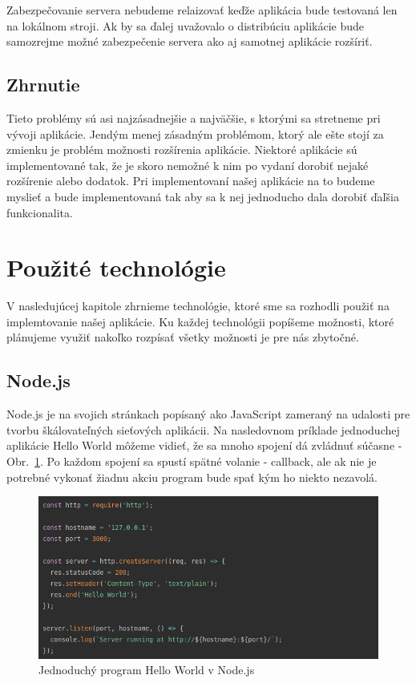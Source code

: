\indent Zabezpečovanie servera nebudeme relaizovať keďže aplikácia bude testovaná len na lokálnom stroji. Ak by sa ďalej uvažovalo o distribúciu aplikácie bude samozrejme možné zabezpečenie servera ako aj samotnej aplikácie rozšíriť.

\subsection{Zhrnutie}
\indent Tieto problémy sú asi najzásadnejšie a najväčšie, s ktorými sa stretneme pri vývoji aplikácie. Jendým menej zásadným problémom, ktorý ale ešte stojí za zmienku je problém možnosti rozšírenia aplikácie. Niektoré aplikácie sú implementované tak, že je skoro nemožné k nim po vydaní dorobiť nejaké rozšírenie alebo dodatok. Pri implementovaní našej aplikácie na to budeme myslieť a bude implementovaná tak aby sa k nej jednoducho dala dorobiť ďaľšia funkcionalita.

\section{Použité technológie}
\indent V nasledujúcej kapitole zhrnieme technológie, ktoré sme sa rozhodli použiť na implemtovanie našej aplikácie. Ku každej technológii popíšeme možnosti, ktoré plánujeme využiť nakoľko rozpísať všetky možnosti je pre nás zbytočné.

\subsection{Node.js}
\indent Node.js je na svojich stránkach popísaný ako JavaScript zameraný na udalosti pre tvorbu škálovateľných sieťových aplikácii. Na nasledovnom príklade jednoduchej aplikácie Hello World môžeme vidieť, že sa mnoho spojení dá zvládnuť súčasne - Obr.~\ref{fig:node_hello}. Po každom spojení sa spustí spätné volanie - callback, ale ak nie je potrebné vykonať žiadnu akciu program bude spať kým ho niekto nezavolá. 

\begin{figure}[H]
    \centering
    \includegraphics[scale=0.55]{img/node_hello.png}
    \caption{Jednoduchý program Hello World v Node.js}
    \label{fig:node_hello}
\end{figure}

